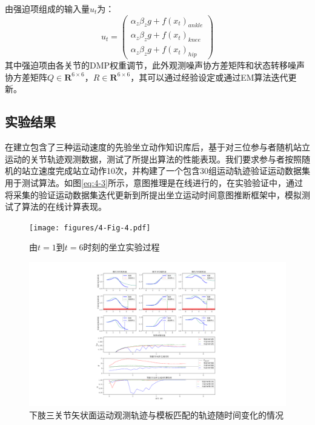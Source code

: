 由强迫项组成的输入量$u_t$为：
\begin{equation}
    u_t=\left(\begin{array}{l}
        \alpha_z \beta_z g+ f\left(x_t\right)_{ankle}\\
        \alpha_z \beta_z g+ f\left(x_t\right)_{knee}\\
        \alpha_z \beta_z g+ f\left(x_t\right)_{hip}
    \end{array}\right)
    \label{eq:4-43}
\end{equation}
其中强迫项由各关节的DMP权重调节，此外观测噪声协方差矩阵和状态转移噪声协方差矩阵$Q\in \mathbf{R}^{6 \times 6}$，$R\in \mathbf{R}^{6 \times 6}$，其可以通过经验设定或通过EM算法迭代更新\cite{bishopPatternRecognitionMachine2006}。

\subsection{实验结果} 
在建立包含了三种运动速度的先验坐立动作知识库后，基于对三位参与者随机站立运动的关节轨迹观测数据，测试了所提出算法的性能表现。我们要求参与者按照随机的站立速度完成站立动作10次，并构建了一个包含30组运动轨迹验证运动数据集用于测试算法。如图\ref{eq:4-3}所示，意图推理是在线进行的，在实验验证中，通过将采集的验证运动数据集迭代更新到所提出坐立运动时间意图推断框架中，模拟测试了算法的在线计算表现。
\begin{figure}[htb]
    \centering\texttt{[image: figures/4-Fig-4.pdf]}
    \caption{由$t=1$到$t=6$时刻的坐立实验过程}
    \label{fig:4-4}
\end{figure}

\begin{figure}[!t]
    \centering
    {
        \begin{minipage}{9.5in}
            \centering
            \includegraphics[width=\textwidth]{figures/4-Fig-5.pdf}
            \caption{下肢三关节矢状面运动观测轨迹与模板匹配的轨迹随时间变化的情况}
        \label{fig:4-5}
        \end{minipage}
    }
\end{figure}

